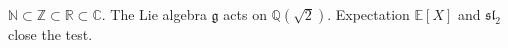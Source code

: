 \documentclass{article}
\begin{document}
$\mathbb{N}\subset\mathbb{Z}\subset\mathbb{R}\subset\mathbb{C}$.
The Lie algebra $\mathfrak{g}$ acts on $\mathbb{Q}(\sqrt{2})$.
Expectation $\mathbb{E}[X]$ and $\mathfrak{sl}_2$ close the test.
\end{document}

